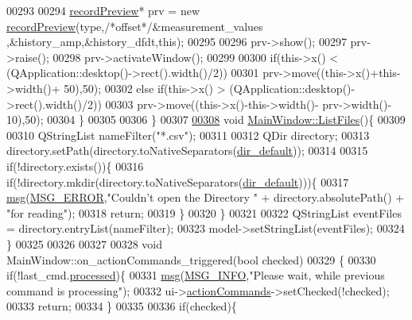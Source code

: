 \begin{DoxyCode}
00293 
00294         \hyperlink{a00020}{recordPreview}* prv = \textcolor{keyword}{new} \hyperlink{a00020}{recordPreview}(type,\textcolor{comment}{/*offset*/}&measurement\_values
      ,&history\_amp,&history\_dfdt,\textcolor{keyword}{this});
00295 
00296         prv->show();
00297         prv->raise();
00298         prv->activateWindow();
00299 
00300         \textcolor{keywordflow}{if}(this->x() < (QApplication::desktop()->rect().width()/2))
00301         prv->move((this->x()+this->width()+ 50),50);
00302         \textcolor{keywordflow}{else} \textcolor{keywordflow}{if}(this->x() > (QApplication::desktop()->rect().width()/2))
00303         prv->move((this->x()-this->width()- prv->width()- 10),50);
00304        \}
00305 
00306 \}
00307 
\hypertarget{a00038_source_l00308}{}\hyperlink{a00006_a61e2ba77e381cae572eec854b6510b81}{00308} \textcolor{keywordtype}{void} \hyperlink{a00006_a61e2ba77e381cae572eec854b6510b81}{MainWindow::ListFiles}()\{
00309 
00310     QStringList nameFilter(\textcolor{stringliteral}{"*.csv"});
00311 
00312     QDir directory;
00313     directory.setPath(directory.toNativeSeparators(\hyperlink{a00006_a2e107e43aeaccaf4c9a42254f13122c8}{dir\_default}));
00314 
00315     \textcolor{keywordflow}{if}(!directory.exists())\{
00316         \textcolor{keywordflow}{if}(!directory.mkdir(directory.toNativeSeparators(\hyperlink{a00006_a2e107e43aeaccaf4c9a42254f13122c8}{dir\_default})))\{
00317             \hyperlink{a00006_a6134b74dbfffbaf333e169bd09597b53}{msg}(\hyperlink{a00034_aa8a990825a5a62c89d2fb8b08d8a1070}{MSG\_ERROR},\textcolor{stringliteral}{"Couldn't open the Directory "} + directory.absolutePath() + \textcolor{stringliteral}{"for
       reading"});
00318         \textcolor{keywordflow}{return};
00319         \}
00320     \}
00321 
00322     QStringList eventFiles = directory.entryList(nameFilter);
00323     model->setStringList(eventFiles);
00324 \}
00325 
00326 
00327 
00328 \textcolor{keywordtype}{void} MainWindow::on\_actionCommands\_triggered(\textcolor{keywordtype}{bool} checked)
00329 \{
00330     \textcolor{keywordflow}{if}(!last\_cmd.\hyperlink{a00001_a3e88f779da9798a5da7dda227e2ca388}{processed})\{
00331         \hyperlink{a00006_a6134b74dbfffbaf333e169bd09597b53}{msg}(\hyperlink{a00034_a1ddcc97224a95cec04b38b0ac866fa19}{MSG\_INFO},\textcolor{stringliteral}{"Please wait, while previous command is processing"});
00332         ui->\hyperlink{a00027_a3dccdc21d3df68b86550093b5e3c0356}{actionCommands}->setChecked(!checked);
00333         \textcolor{keywordflow}{return};
00334     \}
00335 
00336     \textcolor{keywordflow}{if}(checked)\{

\end{DoxyCode}
